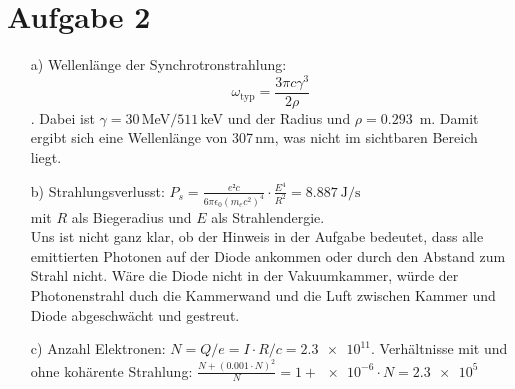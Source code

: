 \documentclass[11pt,a4paper]{article}
\begin{document}
    \section*{Aufgabe 2}
	
	    \begin{enumerate}
   		    \item[a)] Wellenlänge der Synchrotronstrahlung: $$ \omega_\text{typ}=\frac{3\pi c \gamma^3}{2 \rho}$$.
        	Dabei ist $\gamma=30\,$MeV$/511\,$keV und der Radius und $\rho= 0.293\,$ m. 
        	Damit ergibt sich eine Wellenlänge von 307$\,$nm, was nicht im sichtbaren Bereich liegt.
    		\item[b)] Strahlungsverlusst: $P_s=\frac{e²c}{6 \pi \epsilon_0 (m_ec^2)^4} \cdot \frac{E^4}{R^2} = \SI{8.887}{\joule			\per\second}$ \\
		    mit $R$ als Biegeradius und $E$ als Strahlendergie. \\
		    Uns ist nicht ganz klar, ob der Hinweis in der Aufgabe bedeutet, dass alle emittierten Photonen auf der Diode ankommen 			oder durch den Abstand zum Strahl nicht. Wäre die Diode nicht in der Vakuumkammer, würde der Photonenstrahl duch die 			Kammerwand und die Luft zwischen Kammer und Diode abgeschwächt und gestreut.
    		\item[c)] Anzahl Elektronen: $N= Q/e = I \cdot R/c = \num{2.3e11}$.
            Verhältnisse mit und ohne kohärente Strahlung: $\frac{N + (0.001 \cdot N )^2}{N} = 1 + \num{e-6} \cdot N = \num{2.3e5} $
	    \end{enumerate}
\end{document}
